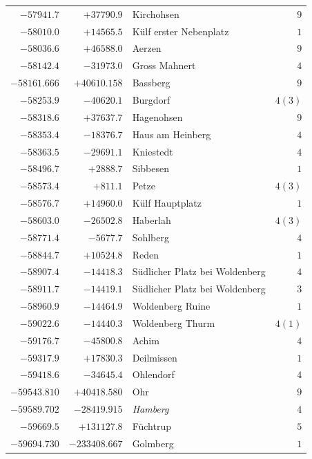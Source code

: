 \begin{center}
\begin{tabular}{r|r|p{170pt}|r}
\(-57941.7\)&\(+37790.9\)&Kirchohsen&\(9\)\\
\(-58010.0\)&\(+14565.5\)&Külf erster Nebenplatz&\(1\)\\
\(-58036.6\)&\(+46588.0\)&Aerzen&\(9\)\\
\(-58142.4\)&\(-31973.0\)&Gross Mahnert&\(4\)\\
\(-58161.666\)&\(+40610.158\)&Bassberg&\(9\)\\
\(-58253.9\)&\(-40620.1\)&Burgdorf&\(4 (3)\)\\
\(-58318.6\)&\(+37637.7\)&Hagenohsen&\(9\)\\
\(-58353.4\)&\(-18376.7\)&Haus am Heinberg&\(4\)\\
\(-58363.5\)&\(-29691.1\)&Kniestedt&\(4\)\\
\(-58496.7\)&\(+2888.7\)&Sibbesen&\(1\)\\
\(-58573.4\)&\(+811.1\)&Petze&\(4 (3)\)\\
\(-58576.7\)&\(+14960.0\)&Külf Hauptplatz&\(1\)\\
\(-58603.0\)&\(-26502.8\)&Haberlah&\(4 (3)\)\\
\(-58771.4\)&\(-5677.7\)&Sohlberg&\(4\)\\
\(-58844.7\)&\(+10524.8\)&Reden&\(1\)\\
\(-58907.4\)&\(-14418.3\)&Südlicher Platz bei Woldenberg\hfill\smash{\raisebox{-4.5pt}{\(\Bigg\}\)}}&\(4\)\\
\(-58911.7\)&\(-14419.1\)&Südlicher Platz bei Woldenberg&\(3\)\\
\(-58960.9\)&\(-14464.9\)&Woldenberg Ruine&\(1\)\\
\(-59022.6\)&\(-14440.3\)&Woldenberg Thurm&\(4 (1)\)\\
\(-59176.7\)&\(-45800.8\)&Achim&\(4\)\\
\(-59317.9\)&\(+17830.3\)&Deilmissen&\(1\)\\
\(-59418.6\)&\(-34645.4\)&Ohlendorf&\(4\)\\
\(-59543.810\)&\(+40418.580\)&Ohr&\(9\)\\
\(-59589.702\)&\(-28419.915\)&\textit{Hamberg}&\(4\)\\
\(-59669.5\)&\(+131127.8\)&Füchtrup&\(5\)\\
\(-59694.730\)&\(-233408.667\)&Golmberg&\(1\)\\
\hline\end{tabular}\endgroup\end{center}
\clearpage
